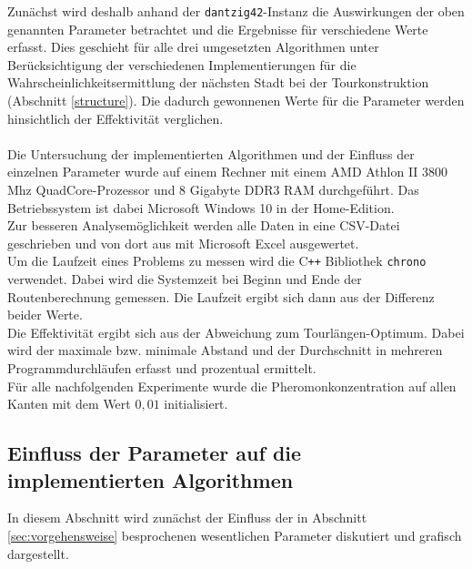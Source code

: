 \documentclass[doktyp=barbeit, sprache=german]{TUBAFarbeiten}
\begin{document}
Zunächst wird deshalb anhand der \texttt{dantzig42}-Instanz die Auswirkungen der oben genannten Parameter betrachtet und die Ergebnisse für verschiedene Werte erfasst.
Dies geschieht für alle drei umgesetzten Algorithmen unter Berücksichtigung der verschiedenen Implementierungen für die Wahrscheinlichkeitsermittlung der nächsten Stadt bei der Tourkonstruktion (Abschnitt \ref{structure}).
Die dadurch gewonnenen Werte für die Parameter werden hinsichtlich der Effektivität verglichen. 
\\\\Die Untersuchung der implementierten Algorithmen und der Einfluss der einzelnen Parameter wurde auf einem Rechner mit einem AMD Athlon II 3800 Mhz QuadCore-Prozessor und 8 Gigabyte DDR3 RAM durchgeführt. Das Betriebssystem ist dabei Microsoft Windows 10 in der Home-Edition.
\\Zur besseren Analysemöglichkeit werden alle Daten in eine CSV-Datei geschrieben und von dort aus mit Microsoft Excel ausgewertet.
\\Um die Laufzeit eines Problems zu messen wird die C\texttt{++} Bibliothek \texttt{chrono} verwendet. Dabei wird die Systemzeit bei Beginn und Ende der Routenberechnung gemessen. Die Laufzeit ergibt sich dann aus der Differenz beider Werte. 
\\Die Effektivität ergibt sich aus der Abweichung zum Tourlängen-Optimum. Dabei wird der maximale bzw. minimale Abstand und der Durchschnitt in mehreren Programmdurchläufen erfasst und prozentual ermittelt.
\\Für alle nachfolgenden Experimente wurde die Pheromonkonzentration auf allen Kanten mit dem Wert $0,01$ initialisiert.
\subsection{Einfluss der Parameter auf die implementierten Algorithmen}
\label{sec:einflussparameter}
In diesem Abschnitt wird zunächst der Einfluss der in Abschnitt \ref{sec:vorgehensweise} besprochenen wesentlichen Parameter diskutiert und grafisch dargestellt. 
\end{document}
